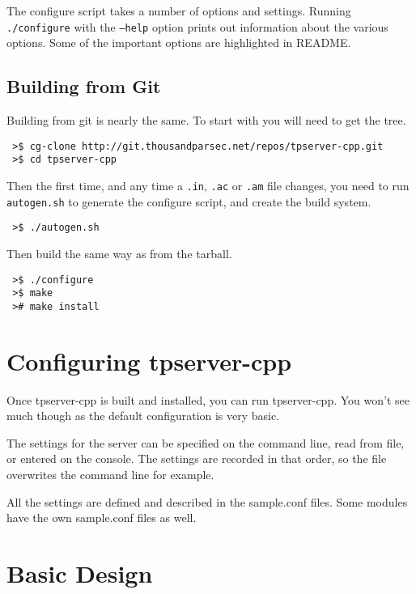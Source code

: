 \documentclass[a4paper,11pt]{report}
\begin{document}
The configure script takes a number of options and settings. Running \texttt{./configure} with the  \texttt{--help} option prints out information about the various options. Some of the important options are highlighted in README.

\section{Building from Git}
\label{sec:build-git}

Building from git is nearly the same.  To start with you will need to get the tree.

\begin{verbatim}
 >$ cg-clone http://git.thousandparsec.net/repos/tpserver-cpp.git
 >$ cd tpserver-cpp
\end{verbatim}

Then the first time, and any time a \texttt{.in}, \texttt{.ac} or \texttt{.am} file changes, you need to run \texttt{autogen.sh} to generate the configure script, and create the build system.

\begin{verbatim}
 >$ ./autogen.sh
\end{verbatim}

Then build the same way as from the tarball.

\begin{verbatim}
 >$ ./configure
 >$ make
 ># make install
\end{verbatim}

\chapter{Configuring tpserver-cpp}
\label{chap:configure}

Once tpserver-cpp is built and installed, you can run tpserver-cpp.  You won't see much though as the default configuration is very basic.

The settings for the server can be specified on the command line, read from file, or entered on the console. The settings are recorded in that order, so the file overwrites the command line for example.

All the settings are defined and described in the sample.conf files. Some modules have the own sample.conf files as well.

\chapter{Basic Design}
\label{chap:design-basic}
\end{document}
